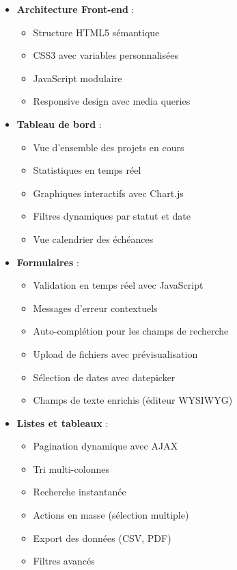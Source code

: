 \documentclass[12pt,a4paper]{article}
\begin{document}
\begin{itemize}
    \item \textbf{Architecture Front-end} :
    \begin{itemize}
        \item Structure HTML5 sémantique
        \item CSS3 avec variables personnalisées
        \item JavaScript modulaire
        \item Responsive design avec media queries
    \end{itemize}

    \item \textbf{Tableau de bord} :
    \begin{itemize}
        \item Vue d'ensemble des projets en cours
        \item Statistiques en temps réel
        \item Graphiques interactifs avec Chart.js
        \item Filtres dynamiques par statut et date
        \item Vue calendrier des échéances
    \end{itemize}

    \item \textbf{Formulaires} :
    \begin{itemize}
        \item Validation en temps réel avec JavaScript
        \item Messages d'erreur contextuels
        \item Auto-complétion pour les champs de recherche
        \item Upload de fichiers avec prévisualisation
        \item Sélection de dates avec datepicker
        \item Champs de texte enrichis (éditeur WYSIWYG)
    \end{itemize}

    \item \textbf{Listes et tableaux} :
    \begin{itemize}
        \item Pagination dynamique avec AJAX
        \item Tri multi-colonnes
        \item Recherche instantanée
        \item Actions en masse (sélection multiple)
        \item Export des données (CSV, PDF)
        \item Filtres avancés
    \end{itemize}


\end{itemize}
\end{document}
